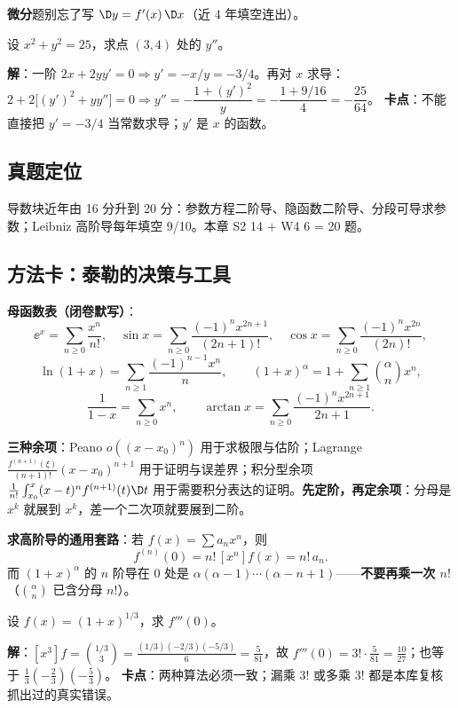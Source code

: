 \noindent\textbf{微分}题别忘了写 $\D y=f'(x)\,\D x$（近 4 年填空连出）。

\begin{keypoint}
设 $x^{2}+y^{2}=25$，求点 $(3,4)$ 处的 $y''$。

\noindent\textbf{解}：一阶 $2x+2yy'=0\Rightarrow y'=-x/y=-3/4$。再对 $x$ 求导：
$2+2\big[(y')^{2}+yy''\big]=0\Rightarrow y''=-\dfrac{1+(y')^{2}}{y}
=-\dfrac{1+9/16}{4}=\boxed{-\dfrac{25}{64}}$。
\textbf{卡点}：不能直接把 $y'=-3/4$ 当常数求导；$y'$ 是 $x$ 的函数。
\end{keypoint}

\subsection{真题定位}
导数块近年由 16 分升到 20 分：参数方程二阶导、隐函数二阶导、分段可导求参数；Leibniz 高阶导每年填空 9/10。本章 S2 14 + W4 6 = 20 题。

\subsection{方法卡：泰勒的决策与工具}

\textbf{母函数表（闭卷默写）}：
\[
\ee^{x}=\sum_{n\ge0}\frac{x^{n}}{n!},\quad
\sin x=\sum_{n\ge0}\frac{(-1)^{n}x^{2n+1}}{(2n+1)!},\quad
\cos x=\sum_{n\ge0}\frac{(-1)^{n}x^{2n}}{(2n)!},
\]
\[
\ln(1+x)=\sum_{n\ge1}\frac{(-1)^{n-1}x^{n}}{n},\qquad
(1+x)^{\alpha}=1+\sum_{n\ge1}\binom{\alpha}{n}x^{n},
\]
\[
\frac1{1-x}=\sum_{n\ge0}x^{n},\qquad
\arctan x=\sum_{n\ge0}\frac{(-1)^{n}x^{2n+1}}{2n+1}.
\]

\textbf{三种余项}：Peano $o((x-x_0)^n)$ 用于求极限与估阶；Lagrange $\frac{f^{(n+1)}(\xi)}{(n+1)!}(x-x_0)^{n+1}$ 用于证明与误差界；积分型余项 $\frac1{n!}\int_{x_0}^{x}(x-t)^{n}f^{(n+1)}(t)\D t$ 用于需要积分表达的证明。\textbf{先定阶，再定余项}：分母是 $x^k$ 就展到 $x^k$，差一个二次项就要展到二阶。

\textbf{求高阶导的通用套路}：若 $f(x)=\sum a_n x^{n}$，则
\[
f^{(n)}(0)=n!\,[x^{n}]f(x)=n!\,a_n .
\]
而 $(1+x)^{\alpha}$ 的 $n$ 阶导在 $0$ 处是 $\alpha(\alpha-1)\cdots(\alpha-n+1)$——\textbf{不要再乘一次 $n!$}（$\binom{\alpha}{n}$ 已含分母 $n!$）。

\begin{keypoint}
设 $f(x)=(1+x)^{1/3}$，求 $f'''(0)$。

\noindent\textbf{解}：$[x^{3}]f=\binom{1/3}{3}=\frac{(1/3)(-2/3)(-5/3)}{6}=\frac{5}{81}$，故 $f'''(0)=3!\cdot\frac{5}{81}=\boxed{\frac{10}{27}}$；也等于 $\frac13(-\frac23)(-\frac53)$。
\textbf{卡点}：两种算法必须一致；漏乘 $3!$ 或多乘 $3!$ 都是本库复核抓出过的真实错误。
\end{keypoint}

